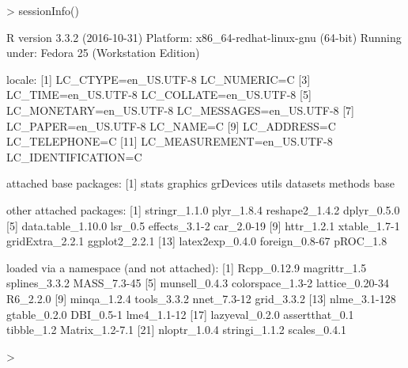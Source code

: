 \documentclass{article}
\begin{document}
\begin{Schunk}
\begin{Sinput}
> sessionInfo()
\end{Sinput}
\begin{Soutput}
R version 3.3.2 (2016-10-31)
Platform: x86_64-redhat-linux-gnu (64-bit)
Running under: Fedora 25 (Workstation Edition)

locale:
 [1] LC_CTYPE=en_US.UTF-8       LC_NUMERIC=C              
 [3] LC_TIME=en_US.UTF-8        LC_COLLATE=en_US.UTF-8    
 [5] LC_MONETARY=en_US.UTF-8    LC_MESSAGES=en_US.UTF-8   
 [7] LC_PAPER=en_US.UTF-8       LC_NAME=C                 
 [9] LC_ADDRESS=C               LC_TELEPHONE=C            
[11] LC_MEASUREMENT=en_US.UTF-8 LC_IDENTIFICATION=C       

attached base packages:
[1] stats     graphics  grDevices utils     datasets  methods   base     

other attached packages:
 [1] stringr_1.1.0     plyr_1.8.4        reshape2_1.4.2    dplyr_0.5.0      
 [5] data.table_1.10.0 lsr_0.5           effects_3.1-2     car_2.0-19       
 [9] httr_1.2.1        xtable_1.7-1      gridExtra_2.2.1   ggplot2_2.2.1    
[13] latex2exp_0.4.0   foreign_0.8-67    pROC_1.8         

loaded via a namespace (and not attached):
 [1] Rcpp_0.12.9      magrittr_1.5     splines_3.3.2    MASS_7.3-45     
 [5] munsell_0.4.3    colorspace_1.3-2 lattice_0.20-34  R6_2.2.0        
 [9] minqa_1.2.4      tools_3.3.2      nnet_7.3-12      grid_3.3.2      
[13] nlme_3.1-128     gtable_0.2.0     DBI_0.5-1        lme4_1.1-12     
[17] lazyeval_0.2.0   assertthat_0.1   tibble_1.2       Matrix_1.2-7.1  
[21] nloptr_1.0.4     stringi_1.1.2    scales_0.4.1    
\end{Soutput}
\begin{Sinput}
> 
\end{Sinput}
\end{Schunk}
\end{document}
